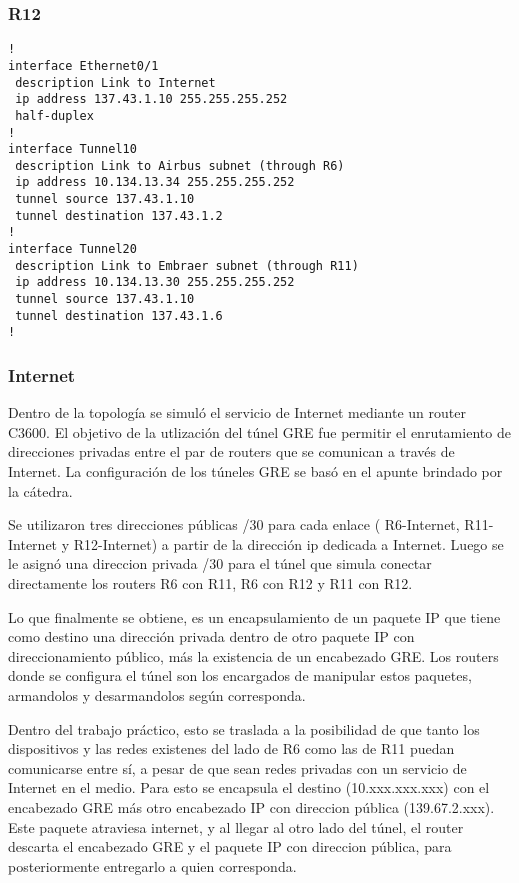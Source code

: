 \documentclass[12pt, a4paper, spanish]{article}
\begin{document}
\subsubsection{R12}
{\small
\begin{verbatim}
!
interface Ethernet0/1
 description Link to Internet
 ip address 137.43.1.10 255.255.255.252
 half-duplex
!
interface Tunnel10
 description Link to Airbus subnet (through R6)
 ip address 10.134.13.34 255.255.255.252
 tunnel source 137.43.1.10
 tunnel destination 137.43.1.2
!
interface Tunnel20
 description Link to Embraer subnet (through R11)
 ip address 10.134.13.30 255.255.255.252
 tunnel source 137.43.1.10
 tunnel destination 137.43.1.6
!
\end{verbatim}
}

\subsubsection{Internet}

Dentro de la topología se simuló el servicio de Internet mediante un 
router C3600.
El objetivo de la utlización del túnel GRE fue permitir el enrutamiento de 
direcciones privadas entre el par de routers que se comunican a través de 
Internet.
La configuración de los túneles GRE se basó en el apunte brindado por la 
cátedra. 

Se utilizaron tres direcciones públicas /30 para cada enlace ( R6-Internet, 
R11-Internet y R12-Internet) a partir de la dirección ip dedicada a Internet.
Luego se le asignó una direccion privada /30 para el túnel que simula 
conectar directamente los routers R6 con R11, R6 con R12 y R11 con R12. 

Lo que finalmente se obtiene, es un encapsulamiento de un paquete IP que 
tiene como destino una dirección privada dentro de otro paquete IP con 
direccionamiento público, más la existencia de un encabezado GRE.
Los routers donde se configura el túnel son los encargados de manipular estos 
paquetes, armandolos y desarmandolos según corresponda.

Dentro del trabajo práctico, esto se traslada a la posibilidad de que tanto 
los dispositivos y las redes existenes del lado de R6 como las de R11 puedan 
comunicarse entre sí, a pesar de que sean redes privadas con un servicio de 
Internet en el medio.
Para esto se encapsula el destino (10.xxx.xxx.xxx) con el encabezado GRE más 
otro encabezado IP con direccion pública (139.67.2.xxx).
Este paquete atraviesa internet, y al llegar al otro lado del túnel, 
el router descarta el encabezado GRE y el paquete IP con direccion pública, 
para posteriormente entregarlo a quien corresponda.
\end{document}
